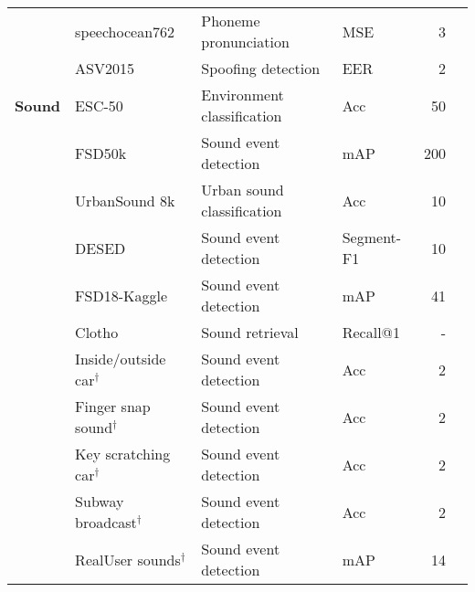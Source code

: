 \documentclass{article}
\newcommand{\cmark}{\ding{51}}%
\newcommand{\xmark}{\ding{55}}%
\begin{document}
\begin{table*}[htb]
\begin{tabularx}{\textwidth}{Xlllrc}
                     & speechocean762 \cite{zhang2021speechocean762}                & Phoneme pronunciation             & MSE               & 3                  & \xmark \\
                     & ASV2015 \cite{kinnunen2018automatic}                         & Spoofing detection                & EER               & 2                  & \cmark \\
\midrule                
\textbf{Sound}       & ESC-50 \cite{piczak2015esc}                                  & Environment classification        & Acc               & 50                 & \cmark \\
                     & FSD50k \cite{fonseca2021fsd50k}                              & Sound event detection             & mAP               & 200                & \xmark \\
                     & UrbanSound 8k \cite{salamon2014dataset}                      & Urban sound classification        & Acc               & 10                 & \cmark \\
                     & DESED \cite{turpault2019sound}                               & Sound event detection             & Segment-F1        & 10                 & \cmark \\
                     & FSD18-Kaggle \cite{fonseca2018general}                       & Sound event detection             & mAP               & 41                 & \xmark \\
                     & Clotho \cite{drossos2020clotho}                              & Sound retrieval                   & Recall@1          & -                  & \xmark \\
                     & Inside/outside car$^{\dagger}$                               & Sound event detection             & Acc               & 2                  & \cmark \\
                     & Finger snap sound$^{\dagger}$                                & Sound event detection             & Acc               & 2                  & \cmark \\
                     & Key scratching car$^{\dagger}$                               & Sound event detection             & Acc               & 2                  & \cmark \\
                     & Subway broadcast$^{\dagger}$                                 & Sound event detection             & Acc               & 2                  & \cmark \\
                     & RealUser sounds$^{\dagger}$                                  & Sound event detection             & mAP               & 14                 & \xmark \\

\end{tabularx}
\end{table*}
\end{document}
